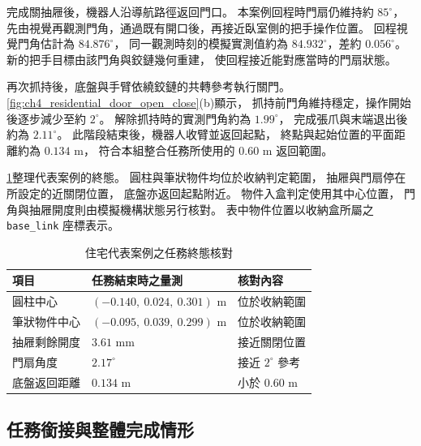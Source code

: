 完成關抽屜後，機器人沿導航路徑返回門口。
本案例回程時門扇仍維持約 $85^\circ$，
先由視覺再觀測門角，通過既有開口後，再接近臥室側的把手操作位置。
回程視覺門角估計為 $84.876^\circ$，
同一觀測時刻的模擬實測值約為 $84.932^\circ$，差約 $0.056^\circ$。
新的把手目標由該門角與鉸鏈幾何重建，
使回程接近能對應當時的門扇狀態。

再次抓持後，底盤與手臂依繞鉸鏈的共轉參考執行關門。
\cref{fig:ch4_residential_door_open_close}(b)顯示，
抓持前門角維持穩定，操作開始後逐步減少至約 $2^\circ$。
解除抓持時的實測門角約為 $1.99^\circ$，
完成張爪與末端退出後約為 $2.11^\circ$。
此階段結束後，機器人收臂並返回起點，
終點與起始位置的平面距離約為 $0.134$ m，
符合本組整合任務所使用的 $0.60$ m 返回範圍。

\cref{tab:ch4_residential_terminal_states}整理代表案例的終態。
圓柱與筆狀物件均位於收納判定範圍，
抽屜與門扇停在所設定的近關閉位置，
底盤亦返回起點附近。
物件入盒判定使用其中心位置，
門角與抽屜開度則由模擬機構狀態另行核對。
表中物件位置以收納盒所屬之 \texttt{base\_link} 座標表示。

\begin{table}[htbp]
    \centering
    \caption{住宅代表案例之任務終態核對}
    \label{tab:ch4_residential_terminal_states}
    \begingroup
    \small
    \renewcommand{\arraystretch}{1.25}
    \begin{tabular}{p{} p{} p{}}
        \hline
        項目 & 任務結束時之量測 & 核對內容 \\
        \hline
        圓柱中心 & $(-0.140,\ 0.024,\ 0.301)$ m & 位於收納範圍 \\
        筆狀物件中心 & $(-0.095,\ 0.039,\ 0.299)$ m & 位於收納範圍 \\
        抽屜剩餘開度 & $3.61$ mm & 接近關閉位置 \\
        門扇角度 & $2.17^\circ$ & 接近 $2^\circ$ 參考 \\
        底盤返回距離 & $0.134$ m & 小於 $0.60$ m \\
        \hline
    \end{tabular}
    \endgroup
\end{table}

\subsection{任務銜接與整體完成情形}
\label{subsec:residential_task_completion}

